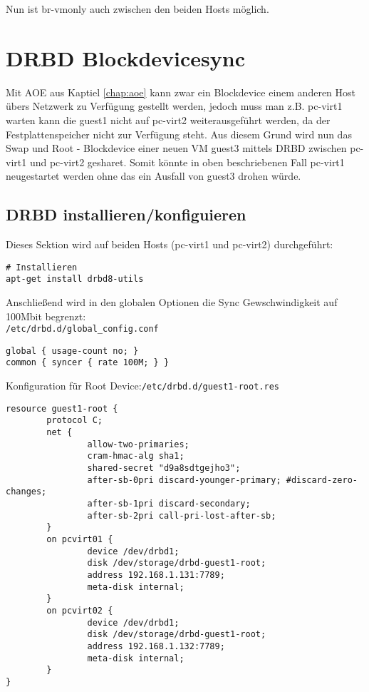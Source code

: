 Nun ist br-vmonly auch zwischen den beiden Hosts möglich.


\chapter{DRBD Blockdevicesync}

Mit AOE aus Kaptiel \ref{chap:aoe} kann zwar ein Blockdevice einem anderen Host übers Netzwerk zu Verfügung gestellt werden, jedoch muss man z.B. pc-virt1 warten kann die guest1 nicht auf pc-virt2 weiterausgeführt werden, da der Festplattenspeicher nicht zur Verfügung steht. Aus diesem Grund wird nun das Swap und Root - Blockdevice einer neuen VM guest3 mittels DRBD zwischen pc-virt1 und pc-virt2 gesharet. Somit könnte in oben beschriebenen Fall pc-virt1 neugestartet werden ohne das ein Ausfall von guest3 drohen würde.

\section{DRBD installieren/konfiguieren}

Dieses Sektion wird auf beiden Hosts (pc-virt1 und pc-virt2) durchgeführt:
\setupVerbatimOut
\begin{verbatim}
# Installieren
apt-get install drbd8-utils
\end{verbatim}

Anschließend wird in den globalen Optionen die Sync Gewschwindigkeit auf 100Mbit begrenzt:
\\
\verb|/etc/drbd.d/global_config.conf|
\setupVerbatimOut
\begin{verbatim}
global { usage-count no; }
common { syncer { rate 100M; } }
\end{verbatim}

Konfiguration für Root Device:\verb|/etc/drbd.d/guest1-root.res|
\setupVerbatimOut
\begin{verbatim}
resource guest1-root {
        protocol C;
        net {
                allow-two-primaries;
                cram-hmac-alg sha1;
                shared-secret "d9a8sdtgejho3";
                after-sb-0pri discard-younger-primary; #discard-zero-changes;
                after-sb-1pri discard-secondary;
                after-sb-2pri call-pri-lost-after-sb;
        }
        on pcvirt01 {
                device /dev/drbd1;
                disk /dev/storage/drbd-guest1-root;
                address 192.168.1.131:7789;
                meta-disk internal;
        }
        on pcvirt02 {
                device /dev/drbd1;
                disk /dev/storage/drbd-guest1-root;
                address 192.168.1.132:7789;
                meta-disk internal;
        }
}
\end{verbatim}

